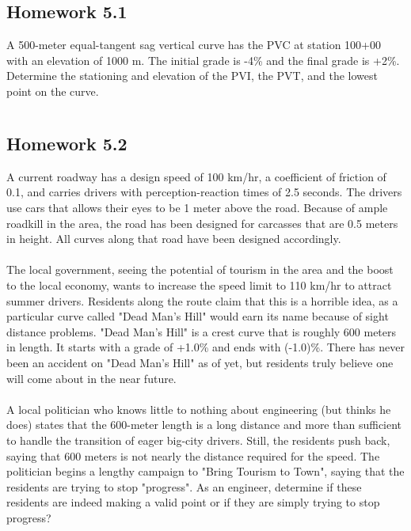 \documentclass{article}
\begin{document}
  \newpage
  \subsection{Homework 5.1}
  A 500-meter equal-tangent sag vertical curve has the PVC at station 100+00 with an elevation of 1000 m. The initial grade is -4\% and the final grade is +2\%. Determine the stationing and elevation of the PVI, the PVT, and the lowest point on the curve.\\
  \begin{align*}
  \\    
  \end{align*}

  \newpage
  \subsection{Homework 5.2}
  A current roadway has a design speed of 100 km/hr, a coefficient of friction of 0.1, and carries drivers with perception-reaction times of 2.5 seconds. The drivers use cars that allows their eyes to be 1 meter above the road. Because of ample roadkill in the area, the road has been designed for carcasses that are 0.5 meters in height. All curves along that road have been designed accordingly.\\
  \\
  The local government, seeing the potential of tourism in the area and the boost to the local economy, wants to increase the speed limit to 110 km/hr to attract summer drivers. Residents along the route claim that this is a horrible idea, as a particular curve called "Dead Man's Hill" would earn its name because of sight distance problems. "Dead Man's Hill" is a crest curve that is roughly 600 meters in length. It starts with a grade of +1.0\% and ends with (-1.0)\%. There has never been an accident on "Dead Man's Hill" as of yet, but residents truly believe one will come about in the near future. \\
  \\
  A local politician who knows little to nothing about engineering (but thinks he does) states that the 600-meter length is a long distance and more than sufficient to handle the transition of eager big-city drivers. Still, the residents push back, saying that 600 meters is not nearly the distance required for the speed. The politician begins a lengthy campaign to "Bring Tourism to Town", saying that the residents are trying to stop "progress". As an engineer, determine if these residents are indeed making a valid point or if they are simply trying to stop progress? \\
  \begin{align*}
  \\    
  \end{align*}

\end{document}
